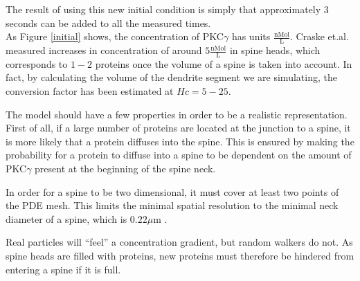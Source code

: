 \noindent The result of using this new initial condition is simply that approximately $3$ seconds can be added to all the measured times. \\

As Figure \ref{initial} shows, the concentration of PKC$\gamma$ has units $\frac{\text{nMol}}{\text{L}}$. 
Craske et.al. measured increases in concentration of around $5\frac{\text{nMol}}{\text{L}}$ in spine heads, which corresponds to $1-2$ proteins once the volume of a spine is taken into account. 
In fact, by calculating the volume of the dendrite segment we are simulating, the conversion factor has been estimated at $Hc = 5-25$. 

The model should have a few properties in order to be a realistic representation. First of all, if a large number of proteins are located at the junction to a spine, it is more likely that a protein diffuses into the spine. This is ensured by making the probability for a protein to diffuse into a spine to be dependent on the amount of PKC$\gamma$ present at the beginning of the spine neck. 

In order for a spine to be two dimensional, it must cover at least two points of the PDE mesh. This limits the minimal spatial resolution to the minimal neck diameter of a spine, which is $0.22\mu$m \cite{arellano2007ultrastructure}.

Real particles will ``feel'' a concentration gradient, but random walkers do not. As spine heads are filled with proteins, new proteins must therefore be hindered from entering a spine if it is full. 

